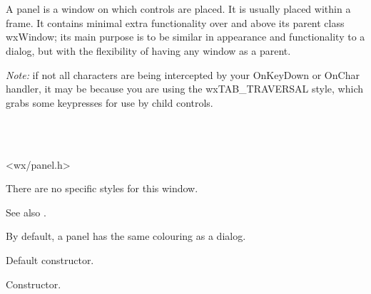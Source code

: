 \section{}\label{wxpanel}

A panel is a window on which controls are placed. It is usually placed within a frame.
It contains minimal extra functionality over and above its parent class wxWindow; its main
purpose is to be similar in appearance and functionality to a dialog, but with the flexibility of
having any window as a parent.

{\it Note:} if not all characters are being intercepted by your OnKeyDown or OnChar handler,
it may be because you are using the wxTAB\_TRAVERSAL style, which grabs some keypresses for use
by child controls.


\\
\\


<wx/panel.h>


There are no specific styles for this window.

See also .


By default, a panel has the same colouring as a dialog.




\label{wxpanelctor}


Default constructor.


Constructor.



